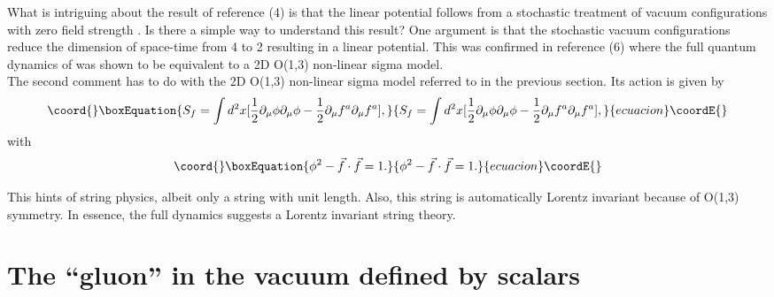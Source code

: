 \documentclass[a4paper,12pt]{article}
\begin{document}
What is intriguing about the result of reference (4) is that the linear potential follows from a stochastic treatment of vacuum configurations with zero field strength \coordHE{}.  Is there a simple way to understand this result?  One argument is that the stochastic vacuum configurations  reduce the dimension of space-time from 4 to 2 resulting in a linear potential.  This was confirmed in reference (6) where the full quantum dynamics of \coordHE{} was shown to be equivalent to a 2D O(1,3) non-linear sigma model.\\

The second comment has to do with the 2D O(1,3) non-linear sigma model referred to in the previous section.  Its action is given by
\begin{equation}\coord{}\boxEquation{\label{10}
S_{f} = \int d^{2}x [\frac{1}{2}\partial_{\mu}\phi\partial_{\mu}\phi-\frac{1}{2}\partial_{\mu}f^{a}\partial_{\mu}f^{a}],
}{S_{f} = \int d^{2}x [\frac{1}{2}\partial_{\mu}\phi\partial_{\mu}\phi-\frac{1}{2}\partial_{\mu}f^{a}\partial_{\mu}f^{a}],
}{ecuacion}\coordE{}\end{equation}
with
\begin{equation}\coord{}\boxEquation{\label{11}
\phi^{2} - \vec{f}\cdot\vec{f} = 1.
}{\phi^{2} - \vec{f}\cdot\vec{f} = 1.
}{ecuacion}\coordE{}\end{equation}

This hints of string physics, albeit only a \coordHE{} string \coordHE{} with unit length.  Also, this string is automatically Lorentz invariant because of O(1,3) symmetry.  In essence, the full \coordHE{} dynamics suggests a Lorentz invariant \coordHE{} string theory.

\section{The ``gluon'' in the vacuum defined by scalars}
\end{document}
